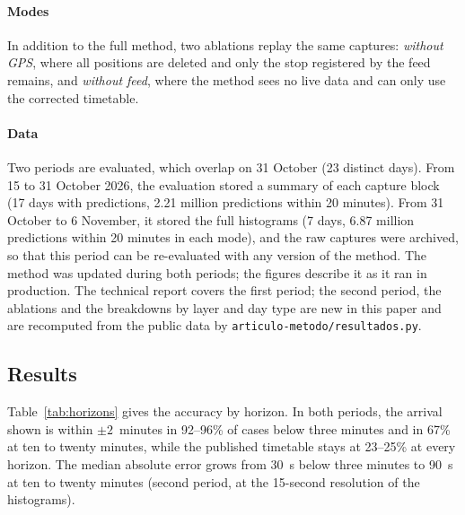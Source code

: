 \documentclass[preprint,11pt,nonatbib]{elsarticle}
\begin{document}
\paragraph{Modes} In addition to the full method, two ablations replay the same captures: \emph{without GPS}, where
all positions are deleted and only the stop registered by the feed remains, and \emph{without feed}, where the method
sees no live data and can only use the corrected timetable.

\paragraph{Data} Two periods are evaluated, which overlap on 31 October (23 distinct days). From 15 to 31 October 2026, the evaluation stored a summary
of each capture block (17 days with predictions, 2.21 million predictions within 20 minutes). From 31 October to
6 November, it stored the full histograms (7 days, 6.87 million predictions within 20 minutes in each mode), and the
raw captures were archived, so that this period can be re-evaluated with any version of the method. The method was
updated during both periods; the figures describe it as it ran in production. The technical report
\parencite{garrido2026memoria} covers the first period; the second period, the ablations and the breakdowns by
layer and day type are new in this paper and are recomputed from the public data by
\texttt{articulo-metodo/resultados.py}.

\subsection{Results}

Table~\ref{tab:horizons} gives the accuracy by horizon. In both periods, the arrival shown is within $\pm2$~minutes
in 92--96\% of cases below three minutes and in 67\% at ten to twenty minutes, while the published timetable stays at
23--25\% at every horizon. The median absolute error grows from 30~s below three minutes to 90~s at ten to twenty
minutes (second period, at the 15-second resolution of the histograms).
\end{document}
